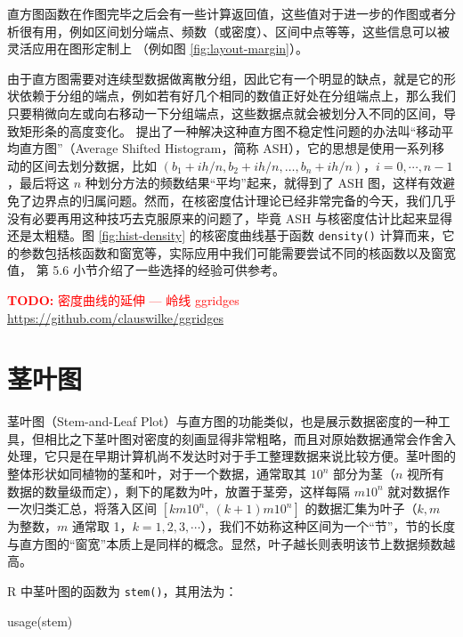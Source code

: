 \documentclass[
  b5paper,
  UTF8,twoside]{book}
\newenvironment{Shaded}{\begin{snugshade}}{\end{snugshade}}
\newcommand{\FunctionTok}[1]{\textcolor[rgb]{0.00,0.00,0.00}{#1}}
\newcommand{\NormalTok}[1]{#1}
\begin{document}
直方图函数在作图完毕之后会有一些计算返回值，这些值对于进一步的作图或者分析很有用，例如区间划分端点、频数（或密度）、区间中点等等，这些信息可以被灵活应用在图形定制上
（例如图 \ref{fig:layout-margin}）。

由于直方图需要对连续型数据做离散分组，因此它有一个明显的缺点，就是它的形状依赖于分组的端点，例如若有好几个相同的数值正好处在分组端点上，那么我们只要稍微向左或向右移动一下分组端点，这些数据点就会被划分入不同的区间，导致矩形条的高度变化。\citet{Scott92} 提出了一种解决这种直方图不稳定性问题的办法叫``移动平均直方图''（Average Shifted Histogram，简称 ASH），它的思想是使用一系列移动的区间去划分数据，比如 \((b_1+ih/n,b_2+ih/n,\ldots,b_n+ih/n)\)，\(i=0,\cdots,n-1\)，最后将这 \(n\) 种划分方法的频数结果``平均''起来，就得到了 ASH 图，这样有效避免了边界点的归属问题。然而，在核密度估计理论已经非常完备的今天，我们几乎没有必要再用这种技巧去克服原来的问题了，毕竟 ASH 与核密度估计比起来显得还是太粗糙。图 \ref{fig:hist-density} 的核密度曲线基于函数 \texttt{density()} 计算而来，它的参数包括核函数和窗宽等，实际应用中我们可能需要尝试不同的核函数以及窗宽值，\citet{Venables02} 第 5.6 小节介绍了一些选择的经验可供参考。

\textcolor{red}{\textbf{TODO: }{密度曲线的延伸 --- 岭线 ggridges \url{https://github.com/clauswilke/ggridges}}}

\hypertarget{ux830eux53f6ux56fe}{%
\section{茎叶图}\label{ux830eux53f6ux56fe}}

茎叶图（Stem-and-Leaf Plot）与直方图的功能类似，也是展示数据密度的一种工具，但相比之下茎叶图对密度的刻画显得非常粗略，而且对原始数据通常会作舍入处理，它只是在早期计算机尚不发达时对于手工整理数据来说比较方便。茎叶图的整体形状如同植物的茎和叶，对于一个数据，通常取其 \(10^n\) 部分为茎（\(n\) 视所有数据的数量级而定），剩下的尾数为叶，放置于茎旁，这样每隔 \(m10^n\) 就对数据作一次归类汇总，将落入区间 \([km10^{n},\ (k+1)m10^{n}]\) 的数据汇集为叶子（\(k,m\) 为整数，\(m\) 通常取 1，\(k=1,2,3,\cdots\)），我们不妨称这种区间为一个``节''，节的长度与直方图的``窗宽''本质上是同样的概念。显然，叶子越长则表明该节上数据频数越高。

R 中茎叶图的函数为 \texttt{stem()}，其用法为：

\begin{Shaded}
\begin{Highlighting}[]
\FunctionTok{usage}\NormalTok{(stem)}
\end{Highlighting}
\end{Shaded}
\end{document}
